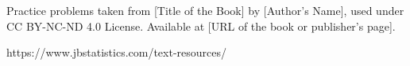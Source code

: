 Practice problems taken from [Title of the Book] by [Author's Name], used under CC BY-NC-ND 4.0 License. Available at [URL of the book or publisher's page].

https://www.jbstatistics.com/text-resources/
